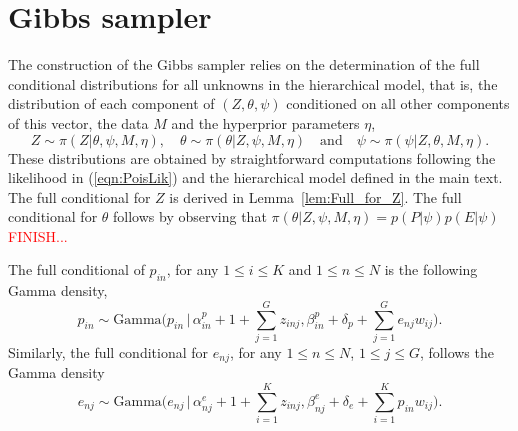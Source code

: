 \documentclass[11pt]{amsart}
\theoremstyle{definition}
\theoremstyle{remark}
\begin{document}
\section{Gibbs sampler}
\label{sec:Gibbs}
The construction of the Gibbs sampler relies on the determination of
the full conditional distributions for all unknowns in the
hierarchical model, that is, the distribution of each component of
$(Z, \theta, \psi)$ conditioned on all other components of this vector,
the data $M$ and the hyperprior parameters $\eta$,
\[
   Z \sim \pi(Z|\theta, \psi, M, \eta), \quad
   \theta \sim \pi(\theta|Z, \psi, M, \eta) \quad
  \text{and}\quad
  \psi \sim \pi(\psi|Z, \theta, M, \eta).
\]
These distributions are obtained by straightforward computations
following the likelihood in (\ref{eqn:PoisLik}) and the hierarchical
model defined in the main text. The full conditional for $Z$ is
derived in Lemma~\ref{lem:Full_for_Z}. The full conditional for
$\theta$ follows by observing that $\pi(\theta|Z, \psi, M, \eta) =
p(P|\psi)p(E|\psi)$ \textcolor{red}{FINISH...}


The full conditional of $p_{in}$, for any $1 \leq i\leq K$ and $1\leq
n\leq  N$ is the following Gamma density,
\begin{equation}
  \label{eqn:Full_for_P}
  p_{in} 
       \sim 
     \text{Gamma}\Big(p_{in}\,\Big|\, \alpha_{in}^p + 1 +
     \sum_{j=1}^G z_{inj}, \beta_{in}^p + \delta_p +
     \sum_{j=1}^G e_{nj}w_{ij}\Big).\tag{$s_2$}
\end{equation}
Similarly, the full conditional for $e_{nj}$, for any $1\leq n\leq 
N$, $1\leq j\leq G$, follows the Gamma density  
\begin{equation}
  \label{eqn:Full_for_E}
  e_{nj} 
     \sim 
   \text{Gamma}\Big(e_{nj}\,\Big|\, \alpha_{nj}^e + 1 +
   \sum_{i=1}^K z_{inj}, \beta_{nj}^e + \delta_e +
   \sum_{i=1}^K p_{in}w_{ij}\Big).\tag{$s_3$}
\end{equation}
\end{document}
